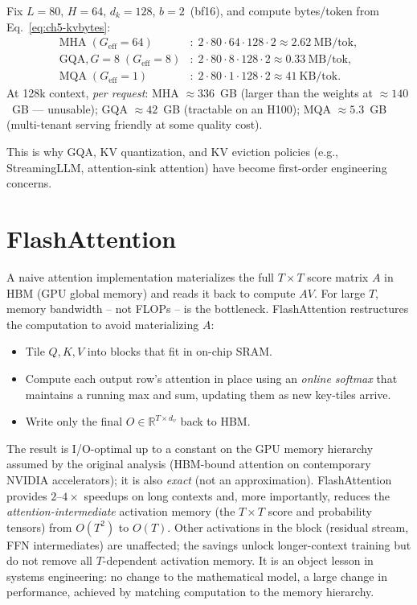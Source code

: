 \begin{workedexample}
Fix $L=80$, $H=64$, $d_k=128$, $b=2$~(bf16), and compute
bytes/token from Eq.~\eqref{eq:ch5-kvbytes}:
\begin{align*}
\text{MHA} \; (G_{\mathrm{eff}}=64) &:
  \;2 \cdot 80 \cdot 64 \cdot 128 \cdot 2 \approx 2.62~\text{MB/tok},\\
\text{GQA}, G=8 \; (G_{\mathrm{eff}}=8) &:
  \;2 \cdot 80 \cdot 8 \cdot 128 \cdot 2 \approx 0.33~\text{MB/tok},\\
\text{MQA} \; (G_{\mathrm{eff}}=1) &:
  \;2 \cdot 80 \cdot 1 \cdot 128 \cdot 2 \approx 41~\text{KB/tok}.
\end{align*}
At 128k context, \emph{per request}: MHA $\approx 336$~GB (larger
than the weights at $\approx 140$~GB --- unusable); GQA $\approx
42$~GB (tractable on an H100); MQA $\approx 5.3$~GB (multi-tenant
serving friendly at some quality cost).
\end{workedexample}

This is why GQA, KV quantization, and KV eviction policies
(e.g., StreamingLLM, attention-sink attention) have become
first-order engineering concerns.

\section{FlashAttention}

A naive attention implementation materializes the full
$T \times T$ score matrix $A$ in HBM (GPU global memory) and reads it
back to compute $AV$. For large $T$, memory bandwidth -- not FLOPs --
is the bottleneck. FlashAttention \citep{dao2022flashattention,
dao2023flashattention2} restructures the computation to avoid
materializing $A$:
\begin{itemize}
  \item Tile $Q, K, V$ into blocks that fit in on-chip SRAM.
  \item Compute each output row's attention in place using an
        \emph{online softmax} that maintains a running max and sum,
        updating them as new key-tiles arrive.
  \item Write only the final $O \in \mathbb{R}^{T \times d_v}$ back
        to HBM.
\end{itemize}
The result is I/O-optimal up to a constant on the GPU memory
hierarchy assumed by the original analysis (HBM-bound attention
on contemporary NVIDIA accelerators); it is also \emph{exact} (not
an approximation). FlashAttention provides $2\text{--}4\times$
speedups on long contexts and, more importantly, reduces the
\emph{attention-intermediate} activation memory (the $T \times T$
score and probability tensors) from $O(T^2)$ to $O(T)$. Other
activations in the block (residual stream, FFN intermediates) are
unaffected; the savings unlock longer-context training but do not
remove all $T$-dependent activation memory. It is an object lesson in systems
engineering: no change to the mathematical model, a large change in
performance, achieved by matching computation to the memory
hierarchy.

